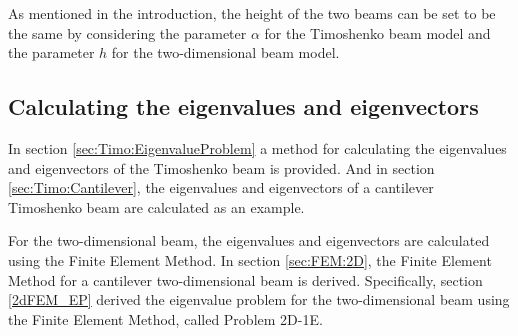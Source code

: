 \documentclass[../../main.tex]{subfiles}
\begin{document}
\begin{figure}[h!]
{{\begin{minipage}[b]{0.8\linewidth}
\begin{center}
				\end{center}
			\end{minipage}
		}
	}
\end{figure}\label{fig:compare:1D+2D_chapter6}

As mentioned in the introduction, the height of the two beams can be set to be the same by considering the parameter $\alpha$ for the Timoshenko beam model and the parameter $h$ for the two-dimensional beam model.

\subsection{Calculating the eigenvalues and eigenvectors}
In section \ref{sec:Timo:EigenvalueProblem} a method for calculating the eigenvalues and eigenvectors of the Timoshenko beam is provided. And in section \ref{sec:Timo:Cantilever}, the eigenvalues and eigenvectors of a cantilever Timoshenko beam are calculated as an example. 

For the two-dimensional beam, the eigenvalues and eigenvectors are calculated using the Finite Element Method. In section \ref{sec:FEM:2D}, the Finite Element Method for a cantilever two-dimensional beam is derived. Specifically, section \ref{2dFEM_EP} derived the eigenvalue problem for the two-dimensional beam using the Finite Element Method, called Problem 2D-1E.
\end{document}
